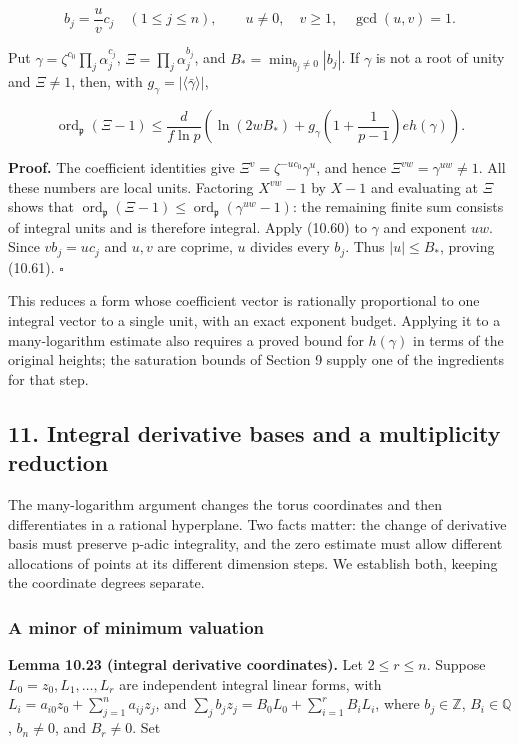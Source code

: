 \documentclass[
  11pt,
  a4paper,
]{article}
\begin{document}
\[
b_j=\frac uv c_j\quad(1\le j\le n),
\qquad u\ne0,\quad v\ge1,\quad \gcd(u,v)=1.
\]

Put \(\gamma=\zeta^{c_0}\prod_j\alpha_j^{c_j}\),
\(\Xi=\prod_j\alpha_j^{b_j}\), and \(B_*=\min_{b_j\ne0}|b_j|\). If
\(\gamma\) is not a root of unity and \(\Xi\ne1\), then, with
\(g_\gamma=|\langle\bar\gamma\rangle|\),

\[
\operatorname{ord}_{\mathfrak p}(\Xi-1)
\le\frac d{f\ln p}
\left(\ln(2wB_*)+
g_\gamma\left(1+\frac1{p-1}\right)e h(\gamma)\right).
\tag{10.61}
\]

\textbf{Proof.} The coefficient identities give
\(\Xi^v=\zeta^{-uc_0}\gamma^u\), and hence \(\Xi^{vw}=\gamma^{uw}\ne1\).
All these numbers are local units. Factoring \(X^{vw}-1\) by \(X-1\) and
evaluating at \(\Xi\) shows that
\(\operatorname{ord}_{\mathfrak p}(\Xi-1)\le
\operatorname{ord}_{\mathfrak p}(\gamma^{uw}-1)\): the remaining finite
sum consists of integral units and is therefore integral. Apply (10.60)
to \(\gamma\) and exponent \(uw\). Since \(v b_j=u c_j\) and \(u,v\) are
coprime, \(u\) divides every \(b_j\). Thus \(|u|\le B_*\), proving
(10.61). \(\square\)

This reduces a form whose coefficient vector is rationally proportional
to one integral vector to a single unit, with an exact exponent budget.
Applying it to a many-logarithm estimate also requires a proved bound
for \(h(\gamma)\) in terms of the original heights; the saturation
bounds of Section 9 supply one of the ingredients for that step.

\subsection{11. Integral derivative bases and a multiplicity
reduction}\label{integral-derivative-bases-and-a-multiplicity-reduction}

The many-logarithm argument changes the torus coordinates and then
differentiates in a rational hyperplane. Two facts matter: the change of
derivative basis must preserve p-adic integrality, and the zero estimate
must allow different allocations of points at its different dimension
steps. We establish both, keeping the coordinate degrees separate.

\subsubsection{A minor of minimum
valuation}\label{a-minor-of-minimum-valuation}

\textbf{Lemma 10.23 (integral derivative coordinates).} Let
\(2\le r\le n\). Suppose \(L_0=z_0,L_1,\ldots,L_r\) are independent
integral linear forms, with \(L_i=a_{i0}z_0+\sum_{j=1}^n a_{ij}z_j\),
and \(\sum_j b_jz_j=B_0L_0+\sum_{i=1}^rB_iL_i\), where
\(b_j\in\mathbb Z\), \(B_i\in\mathbb Q\), \(b_n\ne0\), and \(B_r\ne0\).
Set
\end{document}
